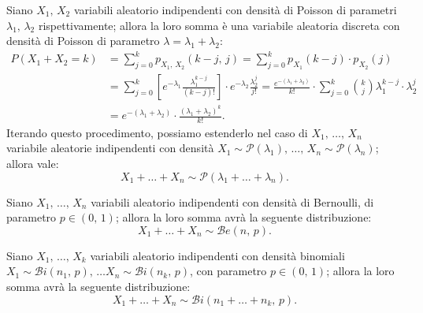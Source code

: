         \begin{obsv}
            Siano $X_1,\, X_2$ variabili aleatorio indipendenti con densità di Poisson di parametri $\lambda_{1},\, \lambda_{2}$ rispettivamente; allora la loro somma è una variabile aleatoria discreta con densità di Poisson di parametro $\lambda = \lambda_1 + \lambda_2$:
            \begin{align*}
                P(X_1 + X_2 = k) &= \sum_{j=0}^{k} p_{X_1,\, X_2}(k-j,\, j) = 
                \sum_{j=0}^{k} p_{X_1}(k-j)\cdot p_{X_2}(j) \\
                                 &= \sum_{j=0}^{k} \left[e^{-\lambda_1} \frac{\lambda_1^{k-j}}{(k-j)!}\right]
                                 \cdot e^{-\lambda_2}\frac{\lambda_2^{j}}{j!} = 
                                 \frac{e^{-(\lambda_1 + \lambda_2)}}{k!}\cdot \sum_{j=0}^{k}\binom{k}{j}\lambda^{k-j}_1 \cdot \lambda^j_2 \\
                                 &= e^{-(\lambda_1 + \lambda_2)}\cdot \frac{(\lambda_1 + \lambda_2)^k}{k!}
            .\end{align*}
            Iterando questo procedimento, possiamo estenderlo nel caso di $X_1,\, \ldots,\, X_{n}$ variabile aleatorie indipendenti con densità $X_1\sim \mathcal{P}(\lambda_1),\, \ldots,\, X_{n}\sim \mathcal{P}(\lambda_n)$; 
            allora vale: \[
                X_1 + \ldots + X_{n} \sim \mathcal{P}(\lambda_1 + \ldots + \lambda_n)
            .\]
        \end{obsv}
        \begin{obsv}
            Siano $X_1,\, \ldots,\, X_{n}$ variabili aleatorio indipendenti con densità di Bernoulli, di parametro $p \in (0,\, 1)$; allora la loro somma avrà la seguente distribuzione: \[
                X_1 + \ldots + X_{n} \sim \mathcal{B}e(n,\, p)
            .\] 
        \end{obsv}
        \begin{obsv}
            Siano $X_1,\, \ldots,\, X_{k}$ variabili aleatorio indipendenti con densità binomiali $X_1\sim \mathcal{B}i(n_1,\,p),\, \ldots X_n\sim \mathcal{B}i(n_k,\,p)$, con parametro $p \in (0,\, 1)$; allora la loro somma avrà la seguente distribuzione: \[
                X_1 + \ldots + X_{n} \sim \mathcal{B}i(n_1+ \ldots +n_k,\, p)
            .\] 
        \end{obsv}
